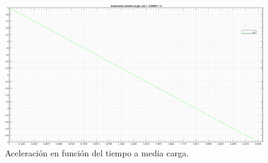 \clearpage

\begin{figure}[!h] %
\begin{center}
\includegraphics[width= \linewidth, keepaspectratio=true, angle=90]{img/grafico_funcion_a.png} %
\caption{\label{fig:fig_position_n_2} \footnotesize{Aceleración en función del tiempo a media carga.}}
\end{center}
\end{figure}

\clearpage

